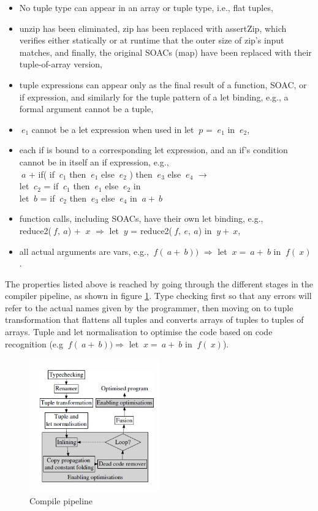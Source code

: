 \documentclass[11pt]{article}
\begin{document}
\begin{itemize}
\item No tuple type can appear in an array or tuple type, i.e., flat
tuples,
\item unzip has been eliminated, zip has been replaced with assertZip,
which verifies either statically or at runtime that the outer size of zip’s input matches, and finally, the original SOACs (map)
have been replaced with their tuple-of-array version,
\item tuple expressions can appear only as the final result of a function,
SOAC, or if expression, and similarly for the tuple pattern
of a let binding, e.g., a formal argument cannot be a tuple,
\item $\: e_1$ cannot be a let expression when used in let $\: p$ = $\: e_1$ in $\: e_2$,
\item each if is bound to a corresponding let expression, and
an if’s condition cannot be in itself an if expression, e.g., \\
$\: a$ + if( if $\: c_1$ then $\: e_1$ else $\: e_2$ ) then $\: e_3$ else $\: e_4$ $\rightarrow$ \\
let $\: c_2$ = if $\: c_1$ then $\: e_1$ else $\: e_2$ in \\
let $\: b$ = if $\: c_2$ then $\: e_3$ else $\: e_4$ in $\: a+ \:b$ 
\item function calls, including SOACs, have their own let binding, e.g., \\
reduce2($\:f,\:a$) + $\:x$ $\Rightarrow$ let $\:y$ = reduce2($\:f,\:e,\:a$) in $\:y+\:x$,
\item all actual arguments are vars, e.g., $\:f(\:a+\:b))$ $\Rightarrow$ let $\:x=\:a+\:b$ in $\:f(\:x)$.
\end{itemize}
The properties listed above is reached by going through the different stages in the compiler pipeline, as shown in figure \ref{fig:pipeline}. Type checking first so that any errors will refer to the actual names given by the programmer, then moving on to tuple transformation that flattens all tuples and converts arrays of tuples to tuples of arrays. Tuple and let normalisation to optimise the code based on code recognition (e.g $\:f(\:a+\:b)) \Rightarrow$ let $\:x=\:a+\:b$ in $\:f(\:x)$).

\begin{figure}[hb!]
  \centering
    \includegraphics[width=0.5\textwidth]{images/pipeline.jpg}
  \caption{Compile pipeline \cite[page 4]{T2Fusion}}
  \label{fig:pipeline}
\end{figure}
\end{document}
